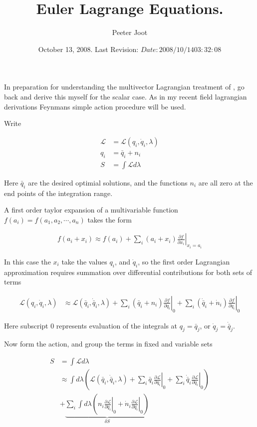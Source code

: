 \documentclass{article}
\title{Euler Lagrange Equations.}
\author{Peeter Joot}
\date{ October 13, 2008.  Last Revision: $Date: 2008/10/14 03:32:08 $ }
\newcommand{\LL}[0]{\mathcal{L}}
\newcommand{\qdot}[0]{\dot{q}}
\newcommand{\ndot}[0]{\dot{n}}
\newcommand{\qbar}[0]{\bar{q}}
\newcommand{\qdotbar}[0]{\dot{\bar{q}}}
\newcommand{\PD}[2]{\frac{\partial {#2}}{\partial {#1}}}
\begin{document}
\maketitle{}


In preparation for understanding the multivector Lagrangian treatment of
\cite{lasenby1993mda}, go back and derive this myself for the scalar
case.  As in my recent field lagrangian derivations Feynmans
\cite{feynman1963flp} simple action procedure will be used.

Write 

\begin{align*}
\LL &= \LL(q_i, \qdot_i, \lambda) \\
q_i &= \qbar_i + n_i \\
S &= \int \LL d\lambda
\end{align*}

Here $\qbar_i$ are the desired optimial solutions, and the functions $n_i$
are all zero at the end points of the integration range.

A first order taylor expansion of a multivariable function
$f(a_i) = f(a_1, a_2, \cdots, a_n)$
takes the form

\begin{align*}
f(a_i + x_i) \approx f(a_i) + \sum_i (a_i + x_i) \left. \PD{x_i}{f} \right\vert_{x_i = a_i}
\end{align*}

In this case the $x_i$ take the values $q_i$, and $\qdot_i$, so the first
order Lagrangian approximation requires summation over differential contributions for both sets of terms

\begin{align*}
\LL(q_i, \qdot_i, \lambda) 
&\approx \LL(\qbar_i, \qdotbar_i, \lambda) 
+ \sum_i (\qbar_i + n_i) \left. \PD{q_i}{f} \right\vert_0
+ \sum_i (\qdotbar_i + \ndot_i) \left. \PD{\qdot_i}{f} \right\vert_0
\end{align*}

Here subscript $0$ represents evaluation of the integrals at $q_j = \qbar_j$, 
or $\qdot_j = \qdotbar_j$.

Now form the action, and group the terms in fixed and variable sets

\begin{align*}
S &= \int \LL d\lambda \\
&\approx
\int d\lambda 
\left(
\LL(\qbar_i, \qdotbar_i, \lambda)
+ \sum_i \qbar_i \left. \PD{q_i}{\LL} \right\vert_0
+ \sum_i \qdotbar_i \left. \PD{\qdot_i}{\LL} \right\vert_0
\right) \\
&+
\underbrace{
\sum_i \int d\lambda
\left(
n_i \left. \PD{q_i}{\LL} \right\vert_0
+\ndot_i \left. \PD{\qdot_i}{\LL} \right\vert_0
\right)
}_{\delta S}
\end{align*}
\end{document}
